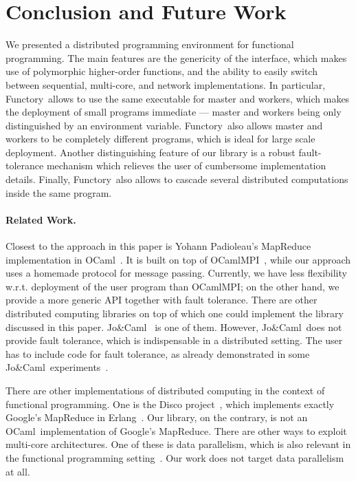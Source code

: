 \documentclass[a4paper,12pt]{article}
\newcommand{\Ocaml}{OCaml}
\newcommand{\functory}{\textsf{Functory}}
\newcommand{\JoCaml}{Jo{\&\!}Caml}
\begin{document}
\section{Conclusion and Future Work}\label{sec:future}

We presented a distributed programming environment for functional
programming. The main features are the genericity of the interface,
which makes use of polymorphic higher-order functions, and the ability
to easily switch between sequential, multi-core, and network
implementations. In particular, \functory\ allows to use the same
executable for master and workers, which makes the deployment of small programs
immediate --- master and workers being only distinguished by an
environment variable. \functory\ also allows master and workers to be
completely different programs, which is ideal for large scale deployment.
Another distinguishing feature of our library is a
robust fault-tolerance mechanism which relieves
the user of cumbersome implementation details.
Finally, \functory\ also allows to cascade several distributed
computations inside the same program.

\paragraph{Related Work.}
Closest to the approach in this paper is Yohann Padioleau's MapReduce
implementation in \Ocaml~\cite{poor-man-mapreduce}.  It is built on
top of OCamlMPI~\cite{ocamlMPI}, while our approach uses a homemade
protocol for message passing.  Currently, we have less flexibility
w.r.t. deployment of the user program than OCamlMPI; on the other
hand, we provide a 
more generic API together with fault tolerance.  There are other
distributed computing libraries on top of which one could implement
the library discussed in this paper. \JoCaml~\cite{jocaml} is one of
them. However, \JoCaml\ does not provide fault tolerance, which is
indispensable in a distributed setting. The user has to include code
for fault tolerance, as already demonstrated in some \JoCaml\
experiments~\cite{mandel2008}. 

There are other implementations of distributed computing in the
context of functional programming. One is the Disco
project~\cite{disco}, which implements exactly Google's MapReduce in
Erlang~\cite{erlang}. Our library, on the contrary, is not an \Ocaml\
implementation of Google's MapReduce.
There are other ways to exploit multi-core architectures. One of these
is data parallelism, which is also relevant in the functional
programming setting~\cite{parallel-haskell}. Our work
does not target data parallelism at all.
\end{document}
